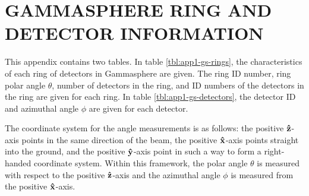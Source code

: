 %
%

\chapter{GAMMASPHERE RING AND DETECTOR INFORMATION}
\label{app:gs-rings-and-detectors}
This appendix contains two tables. In table \ref{tbl:app1-gs-rings}, the characteristics of each ring of detectors in Gammasphere are given. The ring ID number, ring polar angle $\theta$, number of detectors in the ring, and ID numbers of the detectors in the ring are given for each ring. In table \ref{tbl:app1-gs-detectors}, the detector ID and azimuthal angle $\phi$ are given for each detector.

The coordinate system for the angle measurements is as follows: the positive $\boldsymbol{\hat{\textbf{z}}}$-axis points in the same direction of the beam, the positive $\boldsymbol{\hat{\textbf{x}}}$-axis points straight into the ground, and the positive $\boldsymbol{\hat{\textbf{y}}}$-axis point in such a way to form a right-handed coordinate system. Within this framework, the polar angle $\theta$ is measured with respect to the positive $\boldsymbol{\hat{\textbf{z}}}$-axis and the azimuthal angle $\phi$ is measured from the positive $\boldsymbol{\hat{\textbf{x}}}$-axis.

